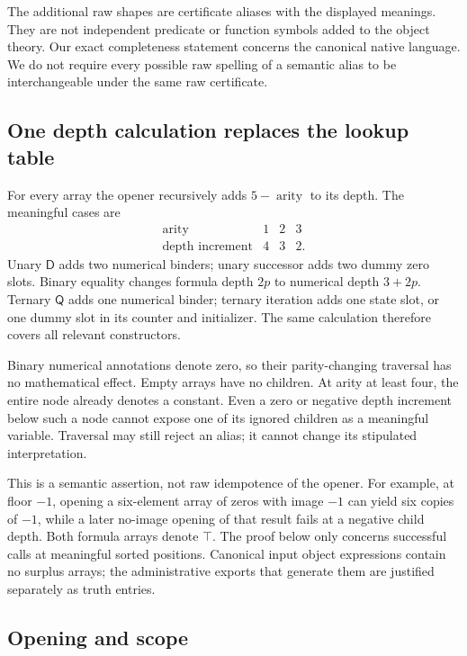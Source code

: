 \documentclass[11pt,letterpaper]{article}
\theoremstyle{definition}
\newcommand{\D}{\mathsf D}
\newcommand{\Q}{\mathsf Q}
\begin{document}
The additional raw shapes are certificate aliases with the displayed
meanings.  They are not independent predicate or function symbols added
to the object theory.  Our exact completeness statement concerns the
canonical native language.  We do not require every possible raw spelling
of a semantic alias to be interchangeable under the same raw certificate.

\subsection{One depth calculation replaces the lookup table}

For every array the opener recursively adds $5-\operatorname{arity}$
to its depth.  The meaningful cases are
\[
\begin{array}{c|ccc}
 \operatorname{arity}&1&2&3\\\hline
 \text{depth increment}&4&3&2.
\end{array}
\]
Unary $\D$ adds two numerical binders; unary successor adds two dummy
zero slots.  Binary equality changes formula depth $2p$ to numerical
depth $3+2p$.  Ternary $\Q$ adds one numerical binder; ternary iteration
adds one state slot, or one dummy slot in its counter and initializer.
The same calculation therefore covers all relevant constructors.

Binary numerical annotations denote zero, so their parity-changing
traversal has no mathematical effect.  Empty arrays have no children.
At arity at least four, the entire node already denotes a constant.
Even a zero or negative depth increment below such a node cannot expose
one of its ignored children as a meaningful variable.  Traversal may
still reject an alias; it cannot change its stipulated interpretation.

This is a semantic assertion, not raw idempotence of the opener.
For example, at floor $-1$, opening a six-element array of zeros with
image $-1$ can yield six copies of $-1$, while a later no-image opening
of that result fails at a negative child depth.  Both formula arrays
denote $\top$.  The proof below only concerns successful calls at meaningful
sorted positions.  Canonical input object expressions contain no surplus
arrays; the administrative exports that generate them are justified
separately as truth entries.

\subsection{Opening and scope}
\label{subsec:opening-lemma}
\end{document}
